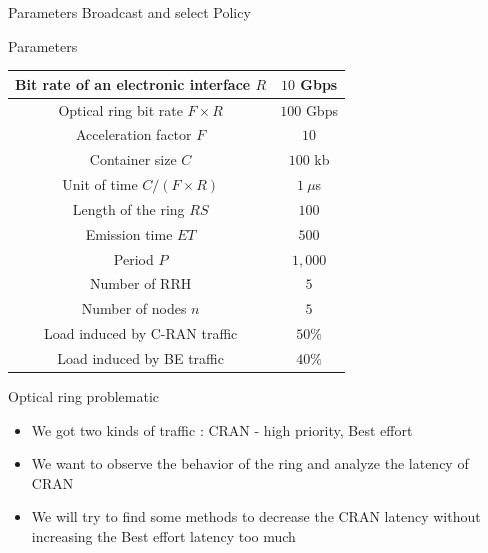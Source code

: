\documentclass[10 pt]{beamer}
\begin{document}
\begin{frame}{Parameters}
 \centering Broadcast and select Policy 
 
 
 \begin{block}{Parameters}
\centering
  \begin{tabular}{|c|c|}
  \hline
  Bit rate of an electronic interface $R$ & $10$ Gbps \tabularnewline
  \hline
  Optical ring bit rate $F\times R$ & $100$ Gbps \tabularnewline
  \hline
    Acceleration factor $F$ & $10$  \tabularnewline
  \hline
  Container size  $C$ & $100$ kb  \tabularnewline
  \hline
  Unit of time $C/(F\times R)$ & $1~\mu$s \tabularnewline
  \hline
  Length of the ring $RS$ & $100$ \tabularnewline
  \hline
  Emission time $ET$ & $500$ \tabularnewline
  \hline
   Period $P$ & $1,000$ \tabularnewline
  \hline
  Number of RRH & $5$  \tabularnewline
  \hline
  Number of nodes $n$ & $5$  \tabularnewline
  \hline
   Load induced by C-RAN traffic & $50\%$  \tabularnewline
  \hline
    Load induced by BE traffic & $40\%$  \tabularnewline
  \hline
  \end{tabular}

 \end{block}

\end{frame}

\begin{frame}{Optical ring problematic}
\begin{itemize}
\item We got two kinds of traffic : CRAN - high priority, Best effort
\vspace{1cm}
\item We want to observe the behavior of the ring and analyze the latency of CRAN
\vspace{1cm}
\item We will try to find some methods to decrease the CRAN latency without increasing the Best effort latency too much
\end{itemize}
\end{frame}
\end{document}
